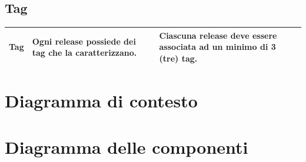 \documentclass[a4paper,12pt]{article}
\begin{document}
\subsection*{Tag}

{
    \centering
    \begin{tabularx}{\textwidth}{|l|>{\raggedright\arraybackslash}X|>{\raggedright\arraybackslash}X|>{\raggedright\arraybackslash}X|}
    \hline
    Tag & Ogni release possiede dei tag che la caratterizzano. & Ciascuna release deve essere associata ad un minimo di 3 (tre) tag. \\
    \hline
    \end{tabularx} \par
}

\newpage
\section{Diagramma di contesto}

\newpage
\section{Diagramma delle componenti}
\end{document}
